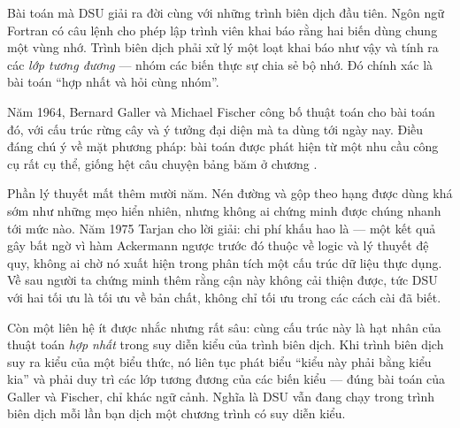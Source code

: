 \documentclass[../../algorithm.tex]{subfiles}
\begin{document}
Bài toán mà DSU giải ra đời cùng với những trình biên dịch đầu tiên. Ngôn ngữ Fortran có câu lệnh  cho phép lập trình viên khai báo rằng hai biến dùng chung một vùng nhớ. Trình biên dịch phải xử lý một loạt khai báo như vậy và tính ra các \emph{lớp tương đương} --- nhóm các biến thực sự chia sẻ bộ nhớ. Đó chính xác là bài toán ``hợp nhất và hỏi cùng nhóm''.

Năm 1964, Bernard Galler và Michael Fischer công bố thuật toán cho bài toán đó, với cấu trúc rừng cây và ý tưởng đại diện mà ta dùng tới ngày nay. Điều đáng chú ý về mặt phương pháp: bài toán được phát hiện từ một nhu cầu công cụ rất cụ thể, giống hệt câu chuyện bảng băm ở chương .

Phần lý thuyết mất thêm mười năm. Nén đường và gộp theo hạng được dùng khá sớm như những mẹo hiển nhiên, nhưng không ai chứng minh được chúng nhanh tới mức nào. Năm 1975 Tarjan cho lời giải: chi phí khấu hao là \cite{tarjan1975} --- một kết quả gây bất ngờ vì hàm Ackermann ngược trước đó thuộc về logic và lý thuyết đệ quy, không ai chờ nó xuất hiện trong phân tích một cấu trúc dữ liệu thực dụng. Về sau người ta chứng minh thêm rằng cận này không cải thiện được, tức DSU với hai tối ưu là tối ưu về bản chất, không chỉ tối ưu trong các cách cài đã biết.

Còn một liên hệ ít được nhắc nhưng rất sâu: cùng cấu trúc này là hạt nhân của thuật toán \emph{hợp nhất} trong suy diễn kiểu của trình biên dịch. Khi trình biên dịch suy ra kiểu của một biểu thức, nó liên tục phát biểu ``kiểu này phải bằng kiểu kia'' và phải duy trì các lớp tương đương của các biến kiểu --- đúng bài toán của Galler và Fischer, chỉ khác ngữ cảnh. Nghĩa là DSU vẫn đang chạy trong trình biên dịch mỗi lần bạn dịch một chương trình có suy diễn kiểu.

\begin{gocre}
\end{gocre}
\end{document}
